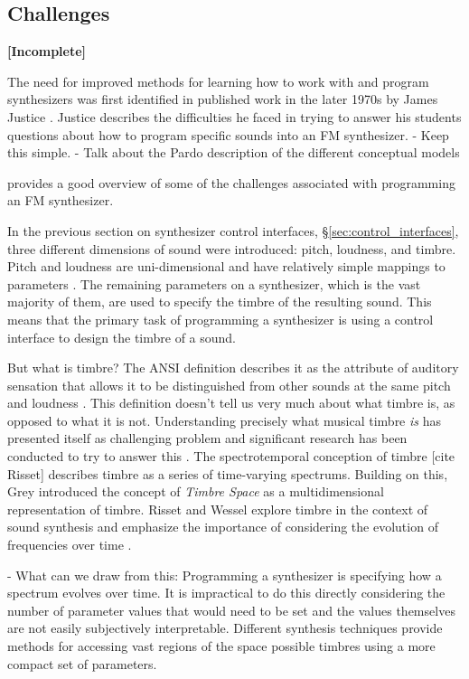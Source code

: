 \subsection{Challenges}
\textbf{[Incomplete]}

The need for improved methods for learning how to work with and program synthesizers was first identified in published work in the later 1970s by James Justice \cite{justice1979analytic}. Justice describes the difficulties he faced in trying to answer his students questions about how to program specific sounds into an FM synthesizer. 
- Keep this simple. 
- Talk about the Pardo description of the different conceptual models

\cite{ashley1986knowledge} provides a good overview of some of the challenges associated with programming an FM synthesizer.

In the previous section on synthesizer control interfaces, \S\ref{sec:control_interfaces}, three different dimensions of sound were introduced: pitch, loudness, and timbre. Pitch and loudness are uni-dimensional and have relatively simple mappings to parameters \cite{seago2004critical}. The remaining parameters on a synthesizer, which is the vast majority of them, are used to specify the timbre of the resulting sound. This means that the primary task of programming a synthesizer is using a control interface to design the timbre of a sound. 

But what is timbre? The ANSI definition describes it as the attribute of auditory sensation that allows it to be distinguished from other sounds at the same pitch and loudness \cite{american1973american}. This definition doesn't tell us very much about what timbre is, as opposed to what it is not. Understanding precisely what musical timbre \textit{is} has presented itself as challenging problem \cite{krumhansl1989musical} and significant research has been conducted to try to answer this \cite{McAdams2019}. The spectrotemporal conception of timbre [cite Risset] describes timbre as a series of time-varying spectrums. Building on this, Grey introduced the concept of \textit{Timbre Space} \cite{grey1977multidimensional} as a multidimensional representation of timbre. Risset and Wessel explore timbre in the context of sound synthesis and emphasize the importance of considering the evolution of frequencies over time \cite{risset1999exploration}. 

- What can we draw from this: Programming a synthesizer is specifying how a spectrum evolves over time. It is impractical to do this directly considering the number of parameter values that would need to be set and the values themselves are not easily subjectively interpretable. Different synthesis techniques provide methods for accessing vast regions of the space possible timbres using a more compact set of parameters. 

